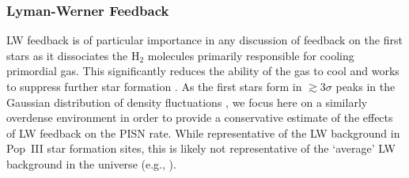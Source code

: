 \documentclass{thesis}
\begin{document}
\subsubsection{Lyman-Werner Feedback}
\label{lymanWerner}
LW feedback is of particular importance in any discussion of feedback
on the first stars as it dissociates the H$_2$ molecules primarily
responsible for cooling primordial gas.  This significantly reduces
the ability of the gas to cool and works to suppress further star
formation \citep{HaimanReesLoeb1997, OmukaiNishi1999,
  CiardiFerraraAbel2000, HaimanAbelRees2000, GloverBrand2001,
  Kitayamaetal2001, MachacekBryanAbel2001, RicottiGnedinShull2001,
  RicottiGnedinShull2002a, RicottiGnedinShull2002b, Yoshidaetal2003,
  OmukaiYoshii2003, MesingerBryanHaiman2006}.  As the first stars form
in $\gtrsim 3\sigma$ peaks in the Gaussian distribution of density
fluctuations \citep{BarkanaLoeb2001}, we focus here on a similarly
overdense environment in order to provide a conservative estimate of
the effects of LW feedback on the PISN rate.  While representative of
the LW background in Pop~III star formation sites, this is likely not
representative of the `average' LW background in the universe (e.g.,
\citealt{MachacekBryanAbel2001, MesingerBryanHaiman2006}).
\end{document}
